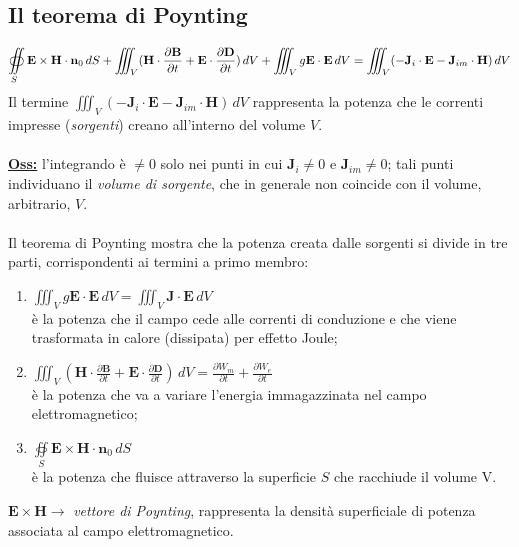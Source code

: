 \documentclass[a4paper]{article}
\let\oldoiint\oiint
\renewcommand{\oiint}{\oldoiint\limits}
\begin{document}
\subsection*{Il teorema di Poynting}
\begin{equation*}
\oiint_{S}\textbf{E}\times\textbf{H}\cdot\textbf{n}_0\,dS+\iiint_{V}(\textbf{H}\cdot\frac{\partial\textbf{B}}{\partial t}+\textbf{E}\cdot\frac{\partial\textbf{D}}{\partial t})\,dV+\iiint_{V}g\textbf{E}\cdot\textbf{E}\,dV=\iiint_{V}(-\textbf{J}_i\cdot\textbf{E}-\textbf{J}_{im}\cdot\textbf{H})\,dV\\\\
\end{equation*}
Il termine $\iiint_{V}(-\textbf{J}_i\cdot\textbf{E}-\textbf{J}_{im}\cdot\textbf{H})\,dV$ rappresenta la potenza che le correnti impresse (\emph{sorgenti}) creano all'interno del volume $V$.\\\\
\underline{\textbf{Oss:}} l'integrando è $\neq0$ solo nei punti in cui $\textbf{J}_i\neq0$ e $\textbf{J}_{im}\neq0$; tali punti individuano il \emph{volume di sorgente}, che in generale non coincide con il volume, arbitrario, $V$.\\\\
Il teorema di Poynting mostra che la potenza creata dalle sorgenti si divide in tre parti, corrispondenti ai termini a primo membro:
\begin{enumerate}
\item $\iiint_{V}g\textbf{E}\cdot\textbf{E}\,dV=\iiint_{V}\textbf{J}\cdot\textbf{E}\,dV$\\
è la potenza che il campo cede alle correnti di conduzione e che viene trasformata in calore (dissipata) per effetto Joule;
\item $\iiint_{V}(\textbf{H}\cdot\frac{\partial\textbf{B}}{\partial t}+\textbf{E}\cdot\frac{\partial\textbf{D}}{\partial t})\,dV=\frac{\partial W_m}{\partial t}+\frac{\partial W_e}{\partial t}$\\
è la potenza che va a variare l'energia immagazzinata nel campo elettromagnetico;
\item $\oiint_{S}\textbf{E}\times\textbf{H}\cdot\textbf{n}_0\,dS$\\
è la potenza che fluisce attraverso la superficie $S$ che racchiude il volume V.
\end{enumerate}
$\textbf{E}\times\textbf{H}\rightarrow$ \emph{vettore di Poynting}, rappresenta la densità superficiale di potenza associata al campo elettromagnetico.\\\\
\end{document}
